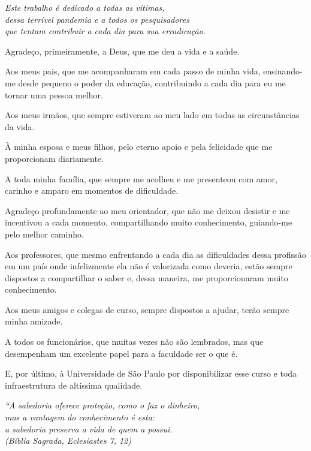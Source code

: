 \documentclass[
12pt,        %
oneside,     %
a4paper,     %
english,       %
brazil        %
%
%
]{ppgca}
\begin{document}
\begin{dedicatoria}
   \vspace*{\fill}
   \centering
   \noindent
   \textit{Este trabalho é dedicado a todas as vítimas,\\
   dessa terrível pandemia e a todos os pesquisadores \\
   que tentam contribuir a cada dia para sua erradicação.} \vspace*{\fill}
\end{dedicatoria}

\begin{agradecimentos}
\noindent
Agradeço, primeiramente, a Deus, que me deu a vida e a saúde.

\noindent
Aos meus pais, que me acompanharam em cada passo de minha vida, ensinando-me desde pequeno o poder da educação, contribuindo a cada dia para eu me tornar uma pessoa melhor.

\noindent
Aos meus irmãos, que sempre estiveram ao meu lado em todas as circunstâncias da vida.

\noindent
À minha esposa e meus filhos, pelo eterno apoio e pela felicidade que me proporcionam diariamente.

\noindent
A toda minha família, que sempre me acolheu e me presenteou com amor, carinho e amparo em momentos de dificuldade.

\noindent
Agradeço profundamente ao meu orientador, que não me deixou desistir e me incentivou a cada momento, compartilhando muito conhecimento, guiando-me pelo melhor caminho. 

\noindent
Aos professores, que mesmo enfrentando a cada dia as dificuldades dessa profissão em um país onde infelizmente ela não é valorizada como deveria, estão sempre dispostos a compartilhar o saber e, dessa maneira, me proporcionaram muito conhecimento. 

\noindent
Aos meus amigos e colegas de curso, sempre dispostos a ajudar, terão sempre minha amizade. 

\noindent
A todos os funcionários, que muitas vezes não são lembrados, mas que desempenham um excelente papel para a faculdade ser o que é. 

\noindent
E, por último, à Universidade de São Paulo por disponibilizar esse curso e toda infraestrutura de altíssima qualidade. 
\end{agradecimentos}

\begin{epigrafe}
    \vspace*{\fill}
        \begin{flushright}
                \textit{``A sabedoria oferece proteção, como o faz o dinheiro, \\
                mas a vantagem do conhecimento é esta: \\
                a sabedoria preserva a vida de quem a possui. \\
                (Bíblia Sagrada, Eclesiastes 7, 12)}
        \end{flushright}
\end{epigrafe}
\end{document}
